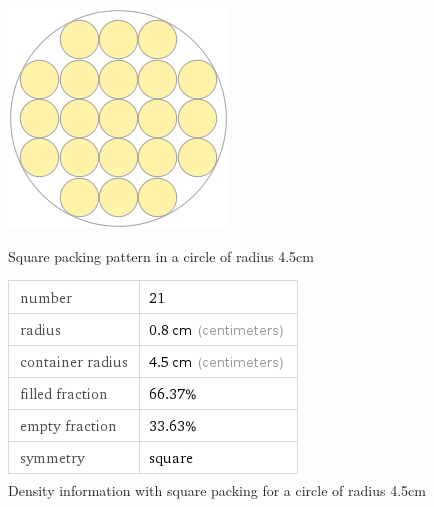 \begin{figure}[ht!]
\centering

    \begin{minipage}{0.4\textwidth}
    \centering
    \includegraphics[width= \textwidth]{Figures/Packing/SquarePacking_r0.8_R4.5.png}
    \caption{Square packing pattern in a circle of radius 4.5cm}
    \label{fig:sqr4.5}
    \end{minipage}\hfill
    \begin{minipage}{0.4\textwidth}
    \centering
    \includegraphics[width= \textwidth]{Figures/Packing/SquarePacking_r0.8_R4.5_packingPercent.png}
    \caption{Density information with square packing for a circle of radius 4.5cm}
    \label{fig:sqr4.5_packinginfo}
    \end{minipage}
    
\end{figure}
\newpage

